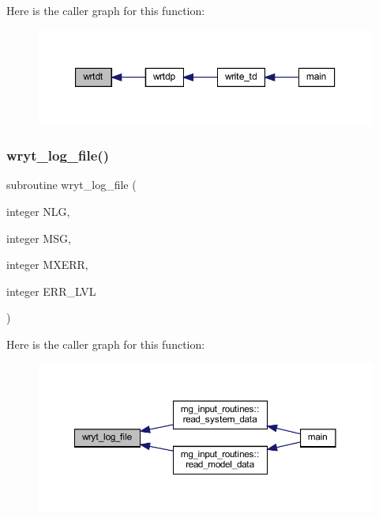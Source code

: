 Here is the caller graph for this function\+:
\nopagebreak
\begin{figure}[H]
\begin{center}
\leavevmode
\includegraphics[width=350pt]{Marco_8f90_a39656ce23a727d198891a5951d6ba7c9_icgraph}
\end{center}
\end{figure}
\mbox{\label{Marco_8f90_a0c927c234a83d54d97adddd80a2c26ff}} 
\subsubsection{\texorpdfstring{wryt\+\_\+log\+\_\+file()}{wryt\_log\_file()}}
{\footnotesize\ttfamily subroutine wryt\+\_\+log\+\_\+file (\begin{DoxyParamCaption}\item[{integer}]{N\+LG,  }\item[{integer}]{M\+SG,  }\item[{integer}]{M\+X\+E\+RR,  }\item[{integer}]{E\+R\+R\+\_\+\+L\+VL }\end{DoxyParamCaption})}

Here is the caller graph for this function\+:
\nopagebreak
\begin{figure}[H]
\begin{center}
\leavevmode
\includegraphics[width=350pt]{Marco_8f90_a0c927c234a83d54d97adddd80a2c26ff_icgraph}
\end{center}
\end{figure}
\mbox{\label{Marco_8f90_acd10a637c4ea5997d217c8927618ed95}} 
